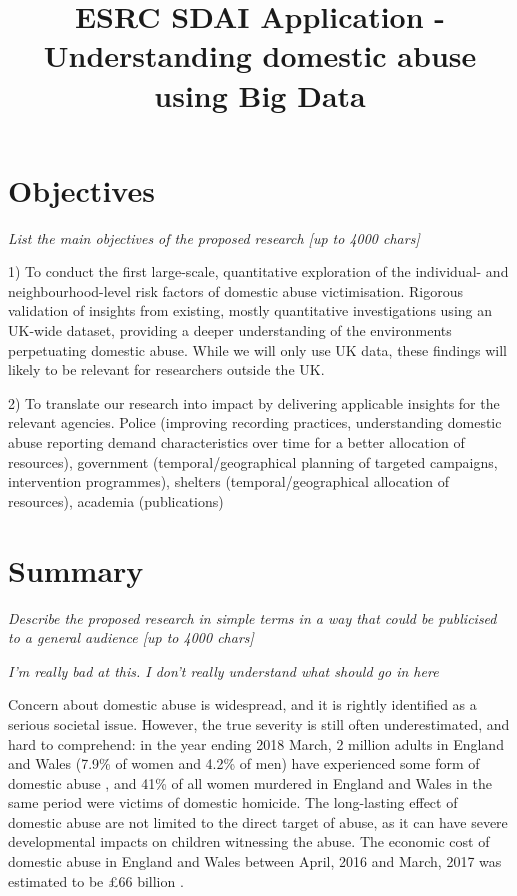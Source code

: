 \documentclass[11pt, a4paper]{article}
\begin{document}
\title{ESRC SDAI Application - Understanding domestic abuse using Big Data}
\date{}
\maketitle
\section{Objectives}
\textit{List the main objectives of the proposed research [up to 4000 chars]}


1) To conduct the first large-scale, quantitative exploration of the individual- and neighbourhood-level risk factors of domestic abuse victimisation. Rigorous validation of insights from existing, mostly quantitative investigations using an UK-wide dataset, providing a deeper understanding of the environments perpetuating domestic abuse. While we will only use UK data, these findings will likely to be relevant for researchers outside the UK. 

2) To translate our research into impact by delivering applicable insights for the relevant agencies.  Police (improving recording practices, understanding domestic abuse reporting demand characteristics over time for a better allocation of resources), government (temporal/geographical planning of targeted campaigns, intervention programmes), shelters (temporal/geographical allocation of resources), academia (publications)
 
\section{Summary}

\textit{Describe the proposed research in simple terms in a way that could be publicised to a general audience [up to 4000 chars]}

\textit{I'm really bad at this. I don't really understand what should go in here}

Concern about domestic abuse is widespread, and it is rightly identified as a serious societal issue. However, the true severity is still often underestimated, and hard to comprehend: in the year ending 2018 March, 2 million adults in England and Wales (7.9\% of women and 4.2\% of men) have experienced some form of domestic abuse \cite{ONS}, and 41\% of all women murdered in England and Wales in the same period were victims of domestic homicide. The long-lasting effect of domestic abuse are not limited to the direct target of abuse, as it can have severe developmental impacts on children witnessing the abuse. The economic cost of domestic abuse in England and Wales between April, 2016 and March, 2017 was estimated to be \pounds 66 billion \cite{costs}. 
\end{document}
